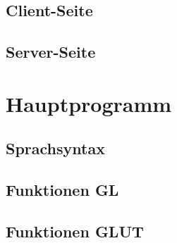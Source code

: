 \subsection{Client-Seite}
\subsection{Server-Seite}

\section{Hauptprogramm}
\subsection{Sprachsyntax}
\subsection{Funktionen GL}
\subsection{Funktionen GLUT}







